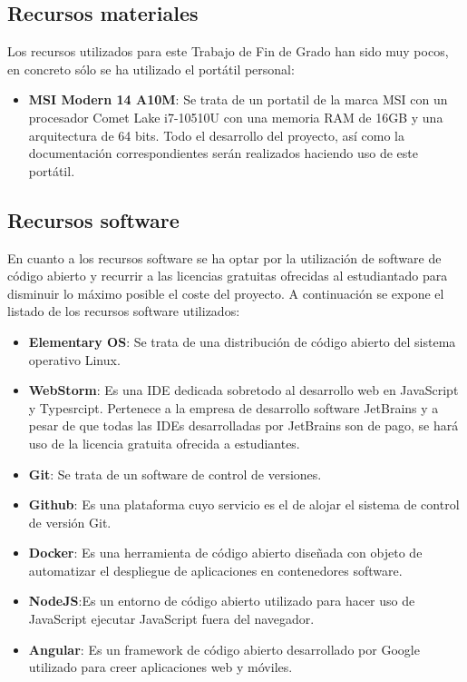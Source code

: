 \subsection{Recursos materiales}
Los recursos utilizados para este Trabajo de Fin de Grado han sido muy pocos, en concreto sólo se ha utilizado el portátil personal:
\begin{itemize}
    \item \textbf{MSI Modern 14 A10M}: Se trata de un portatil de la marca MSI con un procesador Comet Lake i7-10510U con una memoria RAM de 16GB y una arquitectura de 64 bits. Todo el desarrollo del proyecto, así como la documentación correspondientes serán realizados haciendo uso de este portátil.
\end{itemize}
\subsection{Recursos software} \label{recursos-software}
En cuanto a los recursos software se ha optar por la utilización de software de código abierto y recurrir a las licencias gratuitas ofrecidas al estudiantado para disminuir lo máximo posible el coste del proyecto. A continuación se expone el listado de los recursos software utilizados:

\begin{itemize}
    \item \textbf{Elementary OS}: Se trata de una distribución de código abierto del sistema operativo Linux.
    \item \textbf{WebStorm}: Es una IDE dedicada sobretodo al desarrollo web en JavaScript y Typesrcipt. Pertenece a la empresa de desarrollo software JetBrains y a pesar de que todas las IDEs desarrolladas por JetBrains son de pago, se hará uso de la licencia gratuita ofrecida a estudiantes.
    \item \textbf{Git}: Se trata de un software de control de versiones.
    \item \textbf{Github}: Es una plataforma cuyo servicio es el de alojar el sistema de control de versión Git.
    \item \textbf{Docker}: Es una herramienta de código abierto diseñada con objeto de automatizar el despliegue de aplicaciones en contenedores software.
    \item \textbf{NodeJS}:Es un entorno de código abierto utilizado para hacer uso de JavaScript ejecutar JavaScript fuera del navegador.
    \item \textbf{Angular}: Es un framework de código abierto desarrollado por Google utilizado para creer aplicaciones web y móviles.
\end{itemize}

